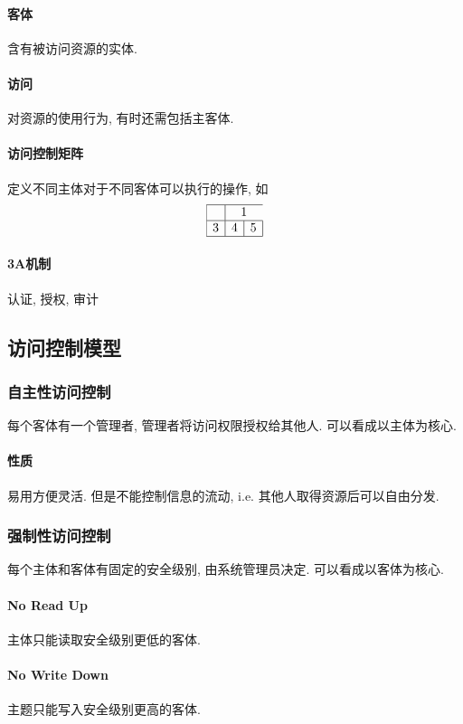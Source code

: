 \documentclass{ctexart}
\begin{document}
\paragraph{客体} 含有被访问资源的实体.
\paragraph{访问} 对资源的使用行为, 有时还需包括主客体.
\paragraph{访问控制矩阵} 定义不同主体对于不同客体可以执行的操作, 如 \[ \begin{array}{|c|c|c|}
        \hline
        & \multicolumn{2}{c}{1} \\ 
        \hline
        3 & 4 & 5 \\
        \hline
    \end{array} \]

\paragraph{3A机制}  认证, 授权, 审计

\subsection{访问控制模型}
\subsubsection{自主性访问控制} 每个客体有一个管理者, 管理者将访问权限授权给其他人. 可以看成以主体为核心.
\paragraph{性质} 易用方便灵活. 但是不能控制信息的流动, i.e. 其他人取得资源后可以自由分发.
\subsubsection{强制性访问控制} 每个主体和客体有固定的安全级别, 由系统管理员决定. 可以看成以客体为核心.
\paragraph{No Read Up} 主体只能读取安全级别更低的客体.
\paragraph{No Write Down} 主题只能写入安全级别更高的客体.
\end{document}
